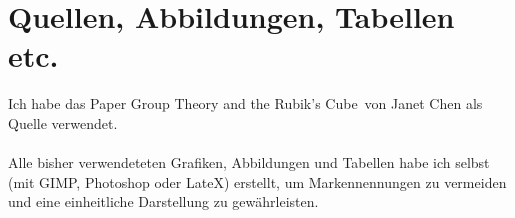 \documentclass[12pt,a4paper, usenames, dvipsnames]{scrartcl}
\begin{document}
\section{Quellen, Abbildungen, Tabellen etc.}
Ich habe das Paper \glqq Group Theory and the Rubik's Cube\grqq \  von Janet Chen als Quelle verwendet.\\ 
\\
Alle bisher verwendeteten Grafiken, Abbildungen und Tabellen habe ich selbst (mit GIMP, Photoshop oder LateX) erstellt, um Markennennungen zu vermeiden und eine einheitliche Darstellung zu gewährleisten.
\end{document}
